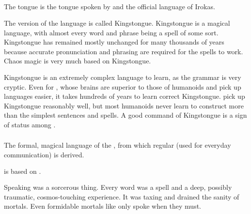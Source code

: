 \subsection{\Draconic}
The \Draconic{} tongue is the tongue spoken by \dragons{} and the official language of Irokas. 

The  version of the language is called Kingstongue. Kingstongue is a magical language, with almost every word and phrase being a spell of some sort. Kingstongue has remained mostly unchanged for many thousands of years because accurate pronunciation and phrasing are required for the spells to work. Chaos magic is very much based on Kingstongue. 

Kingstongue is an extremely complex language to learn, as the grammar is very cryptic. Even for \dragons{}, whose brains are superior to those of humanoids and pick up languages easier, it takes hundreds of years to learn correct Kingstongue. \Rachyth{} pick up Kingstongue reasonably well, but most humanoids never learn to construct more than the simplest sentences and spells. A good command of Kingstongue is a sign of status among \dragons{}. 








\subsubsection{\TrueDraconic}
The formal, magical language of the \dragons, from which regular \Draconic{} (used for everyday communication) is derived. 

\TrueDraconic{} is based on . 

Speaking \TrueDraconic was a sorcerous thing. 
Every word was a spell and a deep, possibly traumatic, cosmos-touching experience.
It was taxing and drained the sanity of mortals. 
Even formidable mortals like \Criseis only spoke \TrueDraconic when they must.






